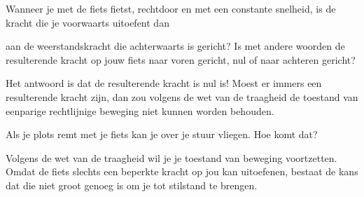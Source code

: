 \documentclass{ximera}
\begin{document}
\begin{exercise}
	Wanneer je met de fiets fietst, rechtdoor en met een constante snelheid, is de kracht die je voorwaarts uitoefent dan
	\begin{multipleChoice}
	\end{multipleChoice}
	aan de weerstandskracht die achterwaarts is gericht? Is met andere woorden de resulterende kracht op jouw fiets naar voren gericht, nul of naar achteren gericht?
	\begin{oplossing}
		Het antwoord is dat de resulterende kracht is nul is! Moest er immers een resulterende kracht zijn, dan zou volgens de wet van de traagheid de toestand van eenparige rechtlijnige beweging niet kunnen worden behouden.
	\end{oplossing}
\end{exercise}

\begin{exercise}
	Als je plots remt met je fiets kan je over je stuur vliegen. Hoe komt dat?
	\begin{oplossing}
		Volgens de wet van de traagheid wil je je toestand van beweging voortzetten. Omdat de fiets slechts een beperkte kracht op jou kan uitoefenen, bestaat de kans dat die niet groot genoeg is om je tot stilstand te brengen.
	\end{oplossing}
\end{exercise}
\end{document}
